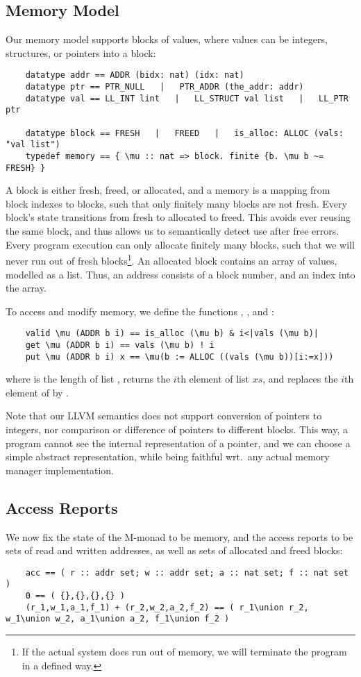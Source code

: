 \documentclass[a4paper,UKenglish,cleveref, autoref, thm-restate]{lipics-v2021}
\begin{document}
  \subsection{Memory Model}
  Our memory model supports blocks of values, where values can be integers, structures, or pointers into a block:
  \begin{lstlisting}
    datatype addr == ADDR (bidx: nat) (idx: nat)
    datatype ptr == PTR_NULL   |   PTR_ADDR (the_addr: addr)
    datatype val == LL_INT lint   |   LL_STRUCT val list   |   LL_PTR ptr

    datatype block == FRESH   |   FREED   |   is_alloc: ALLOC (vals: "val list")
    typedef memory == { \mu :: nat => block. finite {b. \mu b ~= FRESH} }
  \end{lstlisting}
  A block is either fresh, freed, or allocated, and a memory is a mapping from block indexes to blocks,
  such that only finitely many blocks are not fresh. Every block's state transitions from fresh to
  allocated to freed. This avoids ever reusing the same block, and thus allows us to semantically detect use after free errors.
  Every program execution can only allocate finitely many blocks,
  such that we will never run out of fresh blocks\footnote{If the actual system does run out of memory, we will terminate the program in a defined way.}.
  An allocated block contains an array of values, modelled as a list. Thus, an address consists of a block number, and an index into the array.

  To access and modify memory, we define the functions , , and :
  \begin{lstlisting}
    valid \mu (ADDR b i) == is_alloc (\mu b) & i<|vals (\mu b)|
    get \mu (ADDR b i) == vals (\mu b) ! i
    put \mu (ADDR b i) x == \mu(b := ALLOC ((vals (\mu b))[i:=x]))
  \end{lstlisting}
  where  is the length of list ,  returns the \is$i$th element of list \is$xs$,
  and  replaces the \is$i$th element of  by .

  Note that our LLVM semantics does not support conversion of pointers to integers, nor comparison
  or difference of pointers to different blocks. This way, a program cannot see the internal representation of a pointer,
  and we can choose a simple abstract representation, while being
  faithful wrt.\ any actual memory manager implementation.

  \subsection{Access Reports}
  We now fix the state of the M-monad to be memory, and the access reports to be sets
  of read and written addresses, as well as sets of allocated and freed blocks:
  \begin{lstlisting}
    acc == ( r :: addr set; w :: addr set; a :: nat set; f :: nat set )
    0 == ( {},{},{},{} )
    (r_1,w_1,a_1,f_1) + (r_2,w_2,a_2,f_2) == ( r_1\union r_2, w_1\union w_2, a_1\union a_2, f_1\union f_2 )
  \end{lstlisting}
\end{document}
